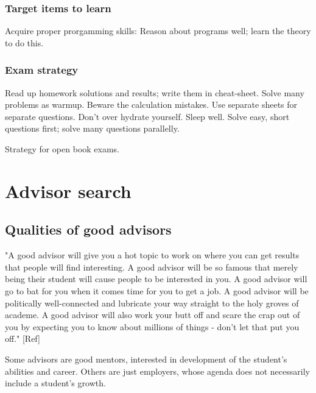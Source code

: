\documentclass[oneside, article]{memoir}
\begin{document}
\subsection{Target items to learn}
Acquire proper prorgamming skills: Reason about programs well; learn the theory to do this.

\subsection{Exam strategy}
Read up homework solutions and results; write them in cheat-sheet. Solve many problems as warmup. Beware the calculation mistakes. Use separate sheets for separate questions. Don't over hydrate yourself. Sleep well. Solve easy, short questions first; solve many questions parallelly.

\subitem Strategy for open book exams.


\chapter{Advisor search}
\section{Qualities of good advisors}
"A good advisor will give you a hot topic to work on where you can get results that people will find interesting. A good advisor will be so famous that merely being their student will cause people to be interested in you. A good advisor will go to bat for you when it comes time for you to get a job. A good advisor will be politically well-connected and lubricate your way straight to the holy groves of academe. A good advisor will also work your butt off and scare the crap out of you by expecting you to know about millions of things - don't let that put you off." [Ref]

Some advisors are good mentors, interested in development of the student's abilities and career. Others are just employers, whose agenda does not necessarily include a student's growth.
\end{document}
